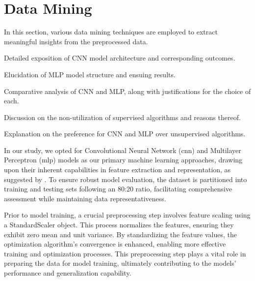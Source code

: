 \section{Data Mining}\label{data_mining}

In this section, various data mining techniques are employed to extract meaningful insights from the preprocessed data.

\begin{description}[style=nextline]
    \item[Convolution Neural Network (CNN):] Detailed exposition of CNN model architecture and corresponding outcomes.
    \item[Multilayer Perceptron (MLP):] Elucidation of MLP model structure and ensuing results.
    \item[Comparison Between CNN and MLP:] Comparative analysis of CNN and MLP, along with justifications for the choice of each.
    \item[Supervised Machine Learning Algorithms:] Discussion on the non-utilization of supervised algorithms and reasons thereof.
    \item[Unsupervised Machine Learning Algorithms:] Explanation on the preference for CNN and MLP over unsupervised algorithms.
\end{description}



In our study, we opted for Convolutional Neural Network (\acrshort{cnn}) and Multilayer Perceptron (\acrshort{mlp}) models as our primary machine learning approaches, drawing upon their inherent capabilities in feature extraction and representation, as suggested by \cite{jiang_uwb_2020}. To ensure robust model evaluation, the dataset is partitioned into training and testing sets following an 80:20 ratio, facilitating comprehensive assessment while maintaining data representativeness.

Prior to model training, a crucial preprocessing step involves feature scaling using a StandardScaler object. This process normalizes the features, ensuring they exhibit zero mean and unit variance. By standardizing the feature values, the optimization algorithm's convergence is enhanced, enabling more effective training and optimization processes. This preprocessing step plays a vital role in preparing the data for model training, ultimately contributing to the models' performance and generalization capability.




